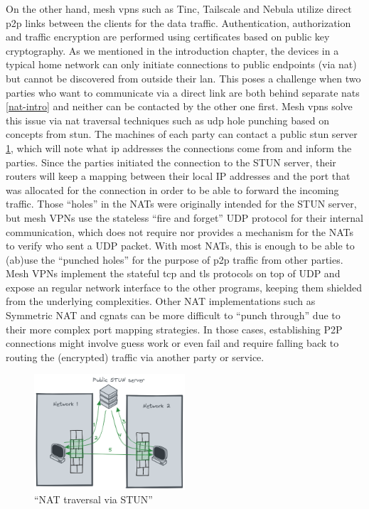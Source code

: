 On the other hand, mesh \glspl{vpn} such as Tinc\autocite{tincDocs},
Tailscale\autocite{tailscaleDocs} and Nebula\autocite{nebulaDocs}
utilize direct \gls{p2p} links between the clients for the data traffic.
Authentication, authorization and traffic encryption are performed using
certificates based on public key cryptography. As we mentioned in the
introduction chapter, the devices in a typical home network can only
initiate connections to public endpoints (via \gls{nat}) but cannot be
discovered from outside their \gls{lan}. This poses a challenge when two
parties who want to communicate via a direct link are both behind
separate \glspl{nat} \ref{nat-intro} and neither can be contacted by the
other one first. Mesh \glspl{vpn} solve this issue via \gls{nat}
traversal techniques such as \gls{udp} hole punching based on concepts
from \gls{stun}. The machines of each party can contact a public
\gls{stun} server \ref{nat-traversal}, which will note what \gls{ip}
addresses the connections come from and inform the parties. Since the
parties initiated the connection to the STUN server, their routers will
keep a mapping between their local IP addresses and the port that was
allocated for the connection in order to be able to forward the incoming
traffic. Those ``holes'' in the NATs were originally intended for the
STUN server, but mesh VPNs use the stateless ``fire and forget'' UDP
protocol for their internal communication, which does not require nor
provides a mechanism for the NATs to verify who sent a UDP packet. With
most NATs, this is enough to be able to (ab)use the ``punched holes''
for the purpose of \gls{p2p} traffic from other parties. Mesh VPNs
implement the stateful \gls{tcp} and \gls{tls} protocols on top of UDP
and expose an regular network interface to the other programs, keeping
them shielded from the underlying complexities. Other NAT
implementations such as Symmetric NAT and \glspl{cgnat} can be more
difficult to ``punch through'' due to their more complex port mapping
strategies. In those cases, establishing P2P connections might involve
guess work or even fail and require falling back to routing the
(encrypted) traffic via another party or service.

\begin{figure}
\centering
\includegraphics[width=0.5\textwidth,height=0.25\textheight]{thesis/../figures/nat-traversal.png}
\caption{``NAT traversal via STUN''\label{nat-traversal}}
\end{figure}


